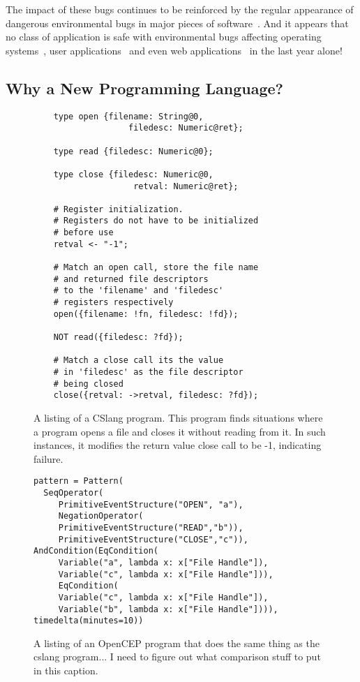 The impact of these bugs continues to be reinforced by the regular
appearance of dangerous environmental bugs in major pieces of
software~\cite{devzeroroot}.  And it appears that no class of application
is safe with environmental bugs affecting operating systems~\cite{bad},
user applications~\cite{bad} and even web applications~\cite{bad} in the
last year alone!





\subsection{Why a New Programming Language?}
\begin{figure}
  \begin{lstlisting}
    type open {filename: String@0,
                   filedesc: Numeric@ret};

    type read {filedesc: Numeric@0};

    type close {filedesc: Numeric@0,
                    retval: Numeric@ret};

    # Register initialization.
    # Registers do not have to be initialized
    # before use
    retval <- "-1";

    # Match an open call, store the file name
    # and returned file descriptors
    # to the 'filename' and 'filedesc'
    # registers respectively
    open({filename: !fn, filedesc: !fd});

    NOT read({filedesc: ?fd});

    # Match a close call its the value
    # in 'filedesc' as the file descriptor
    # being closed
    close({retval: ->retval, filedesc: ?fd});

  \end{lstlisting}
  \caption{A listing of a CSlang program.  This program finds situations
  where a program opens a file and closes it without reading from it.  In
  such instances, it modifies the return value close call to be -1,
  indicating failure.}
  \label{fig:cslanglisting}
\end{figure}

\begin{figure}
  \begin{lstlisting}
pattern = Pattern(
  SeqOperator(
     PrimitiveEventStructure("OPEN", "a"),
     NegationOperator(
     PrimitiveEventStructure("READ","b")),
     PrimitiveEventStructure("CLOSE","c")),
AndCondition(EqCondition(
     Variable("a", lambda x: x["File Handle"]),
     Variable("c", lambda x: x["File Handle"])),
     EqCondition(
     Variable("c", lambda x: x["File Handle"]),
     Variable("b", lambda x: x["File Handle"]))),
timedelta(minutes=10))
  \end{lstlisting}
  \caption{A listing of an OpenCEP program that does the same thing as the
  cslang program... I need to figure out what comparison stuff to put in
  this caption.}
  \label{fig:flinklisting}
\end{figure}



